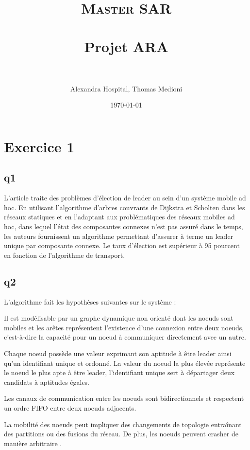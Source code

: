 \documentclass[paper=a4, fontsize=11pt]{scrartcl} %
\title{	
\normalfont \normalsize 
\textsc{Master SAR} \\ [25pt] %
\horrule{0.5pt} \\[0.4cm] %
\huge Projet ARA \\ %
\horrule{2pt} \\[0.5cm] %
}
\author{Alexandra Hospital, Thomas Medioni} %
\date{\normalsize\today} %
\numberwithin{equation}{section} %
\numberwithin{figure}{section} %
\numberwithin{table}{section} %
\begin{document}
\maketitle %


\section{Exercice 1}

\subsection{q1}

L'article traite des problèmes d'élection de leader au sein d'un système mobile ad hoc. En utilisant l'algorithme d'arbres couvrants de Dijkstra et Scholten dans les réseaux statiques et en l'adaptant aux problématiques des réseaux mobiles ad hoc, dans lequel l'état des composantes connexes n'est pas assuré dans le temps, les auteurs fournissent un algorithme permettant d'assurer à terme un leader unique par composante connexe. Le taux d'élection est supérieur à 95 pourcent en fonction de l'algorithme de transport.

\subsection{q2}

L'algorithme fait les hypothèses suivantes sur le système :

Il est modélisable par un graphe dynamique non orienté dont les noeuds sont mobiles et les arêtes représentent l'existence d'une connexion entre deux noeuds, c'est-à-dire la capacité pour un noeud à communiquer directement avec un autre.

Chaque noeud possède une valeur exprimant son aptitude à être leader ainsi qu'un identifiant unique et ordonné. La valeur du noeud la plus élevée représente le noeud le plus apte à être leader, l'identifiant unique sert à départager deux candidats à aptitudes égales.

Les canaux de communication entre les noeuds sont bidirectionnels et respectent un ordre FIFO entre deux noeuds adjacents.

La mobilité des noeuds peut impliquer des changements de topologie entraînant des partitions ou des fusions du réseau. De plus, les noeuds peuvent crasher de manière arbitraire .
\end{document}

